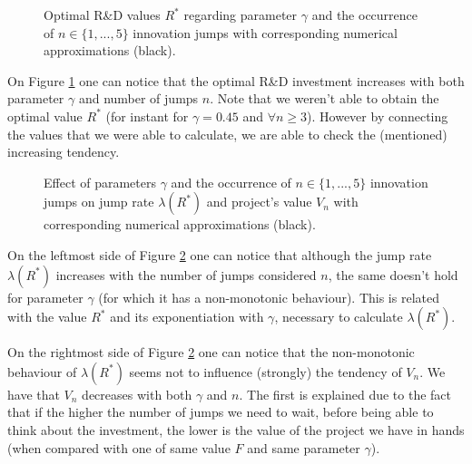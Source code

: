 \begin{figure}[!htb]
	\begin{subfigmatrix}{2}
	\end{subfigmatrix}
	\caption{Optimal R\&D values $R^*$ regarding parameter $\gamma$ and the occurrence of $n\in \{1,...,5\}$ innovation jumps with corresponding numerical approximations (black). }
	\label{fig:max_nR}
\end{figure}

On Figure \ref{fig:max_nR} one can notice that the optimal R\&D investment increases with both parameter $\gamma$ and number of jumps $n$. Note that we weren't able to obtain the optimal value $R^*$ (for instant for $\gamma=0.45$ and $\forall n\geq 3$). However by connecting the values that we were able to calculate, we are able to check the (mentioned) increasing tendency.

\begin{figure}[!htb]
	\begin{subfigmatrix}{2}
	\end{subfigmatrix}
	\caption{Effect of parameters $\gamma$ and the occurrence of $n\in \{1,...,5\}$ innovation jumps on jump rate $\lambda(R^*)$ and project's value $V_n$ with corresponding numerical approximations (black). }
	\label{fig:max_n}
\end{figure}

On the leftmost side of Figure \ref{fig:max_n} one can notice that although the jump rate $\lambda(R^*)$ increases with the number of jumps considered $n$, the same doesn't hold for parameter $\gamma$ (for which it has a non-monotonic behaviour). This is related with the value $R^*$ and its exponentiation with $\gamma$, necessary to calculate $\lambda(R^*)$.

On the rightmost side of Figure \ref{fig:max_n} one can notice that the non-monotonic behaviour of $\lambda(R^*)$ seems not to influence (strongly) the tendency of $V_n$. We have that $V_n$ decreases with both $\gamma$ and $n$.
The first is explained due to the fact that if the higher the number of jumps we need to wait, before being able to think about the investment, the lower is the value of the project we have in hands (when compared with one of same value $F$ and same parameter $\gamma$).
